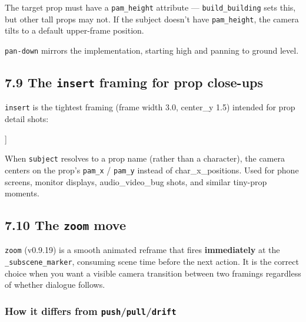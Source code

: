 \documentclass[
  12pt,
  letterpaper,
]{book}
\newenvironment{Shaded}{}{}
\newcommand{\NormalTok}[1]{#1}
\begin{document}
The target prop must have a \texttt{pam\_height} attribute ---
\texttt{build\_building} sets this, but other tall props may not. If the
subject doesn't have \texttt{pam\_height}, the camera tilts to a default
upper-frame position.

\texttt{pan-down} mirrors the implementation, starting high and panning
to ground level.

\subsection{\texorpdfstring{7.9 The \texttt{insert} framing for prop
close-ups}{7.9 The insert framing for prop close-ups}}\label{the-insert-framing-for-prop-close-ups}

\texttt{insert} is the tightest framing (frame width 3.0, center\_y 1.5)
intended for prop detail shots:

\begin{Shaded}
\begin{Highlighting}[]
\NormalTok{[[ CAMERA: FRAMING=insert | SUBJECT=smartphone | MOVE=null | TRANSITION=cut ]]}
\end{Highlighting}
\end{Shaded}

When \texttt{subject} resolves to a prop name (rather than a character),
the camera centers on the prop's \texttt{pam\_x} / \texttt{pam\_y}
instead of char\_x\_positions. Used for phone screens, monitor displays,
audio\_video\_bug shots, and similar tiny-prop moments.

\subsection{\texorpdfstring{7.10 The \texttt{zoom}
move}{7.10 The zoom move}}\label{the-zoom-move}

\texttt{zoom} (v0.9.19) is a smooth animated reframe that fires
\textbf{immediately} at the \texttt{\_subscene\_marker}, consuming scene
time before the next action. It is the correct choice when you want a
visible camera transition between two framings regardless of whether
dialogue follows.

\subsubsection{How it differs from \texttt{push}/\texttt{pull}/\texttt{drift}}\label{zoom-vs-deferred}
\end{document}
